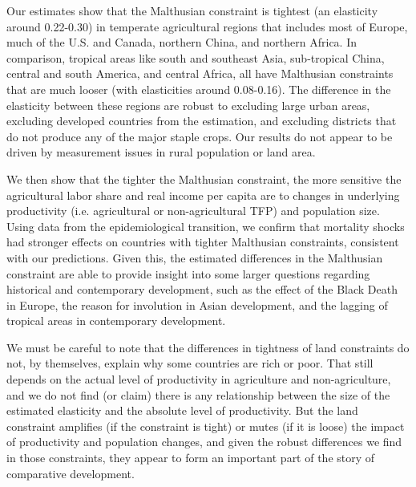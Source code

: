 \documentclass[11pt]{article}
\begin{document}
Our estimates show that the Malthusian constraint is tightest (an elasticity around 0.22-0.30) in temperate agricultural regions that includes most of Europe, much of the U.S. and Canada, northern China, and northern Africa. In comparison, tropical areas like south and southeast Asia, sub-tropical China, central and south America, and central Africa, all have Malthusian constraints that are much looser (with elasticities around 0.08-0.16). The difference in the elasticity between these regions are robust to excluding large urban areas, excluding developed countries from the estimation, and excluding districts that do not produce any of the major staple crops. Our results do not appear to be driven by measurement issues in rural population or land area.

We then show that the tighter the Malthusian constraint, the more sensitive the agricultural labor share and real income per capita are to changes in underlying productivity (i.e. agricultural or non-agricultural TFP) and population size. Using data from the epidemiological transition, we confirm that mortality shocks had stronger effects on countries with tighter Malthusian constraints, consistent with our predictions. Given this, the estimated differences in the Malthusian constraint are able to provide insight into some larger questions regarding historical and contemporary development, such as the effect of the Black Death in Europe, the reason for involution in Asian development, and the lagging of tropical areas in contemporary development. 

We must be careful to note that the differences in tightness of land constraints do not, by themselves, explain why some countries are rich or poor. That still depends on the actual level of productivity in agriculture and non-agriculture, and we do not find (or claim) there is any relationship between the size of the estimated elasticity and the absolute level of productivity. But the land constraint amplifies (if the constraint is tight) or mutes (if it is loose) the impact of productivity and population changes, and given the robust differences we find in those constraints, they appear to form an important part of the story of comparative development.

\newpage

\clearpage

\onehalfspacing
{\small


}
\end{document}
